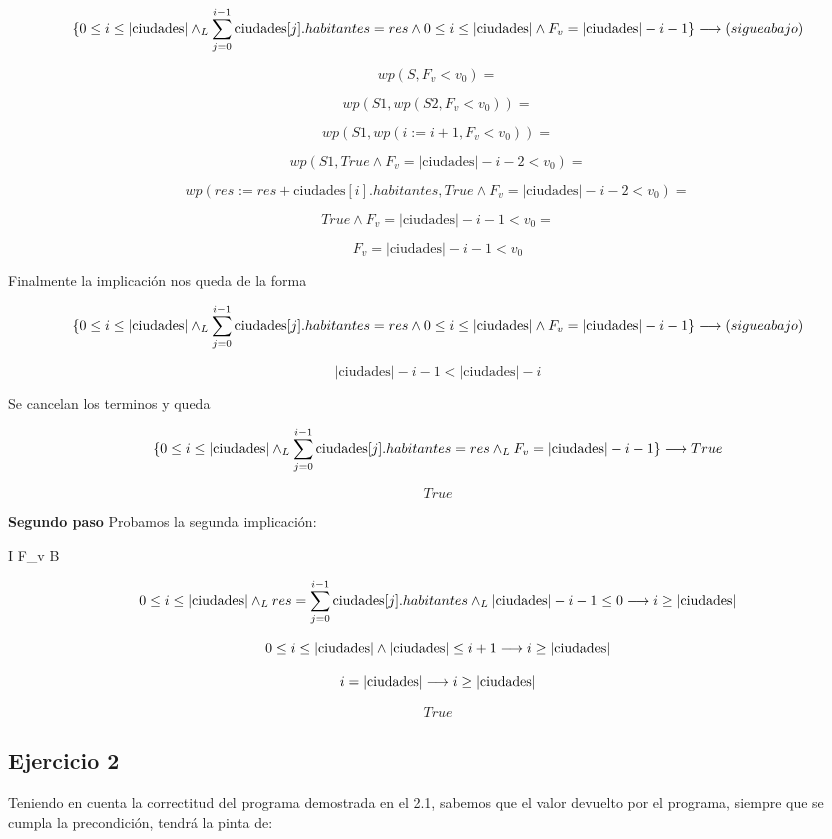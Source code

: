 \documentclass[10pt,a4paper]{article}
\begin{document}
\[
\{0 \leq i \leq |\text{ciudades}| \land _L \sum_{j=0}^{i-1} \text{ciudades}[j].habitantes = res \land 0 \leq i \leq |\text{ciudades}| \land F_v = |\text{ciudades}| - i - 1\} \longrightarrow (sigue abajo)
\]

\[
wp(S, F_v < v_0) =
\]

\[
wp(S1, wp(S2, F_v < v_0)) =
\]

\[
wp(S1, wp(i:=i+1, F_v < v_0)) =
\]

\[
wp(S1, True \land F_v = |\text{ciudades}| - i - 2 < v_0) =
\]

\[
wp(res:= res + \text{ciudades}[i].habitantes, True \land F_v = |\text{ciudades}| - i - 2 < v_0) = 
\]

\[
True \land F_v = |\text{ciudades}| - i - 1 < v_0 =
\]

\[
F_v = |\text{ciudades}| - i - 1 < v_0
\]

Finalmente la implicación nos queda de la forma

\[
\{0 \leq i \leq |\text{ciudades}| \land _L \sum_{j=0}^{i-1} \text{ciudades}[j].habitantes = res \land 0 \leq i \leq |\text{ciudades}| \land F_v = |\text{ciudades}| - i - 1\} \longrightarrow (sigue abajo)
\]

\[
|\text{ciudades}| - i - 1 < |\text{ciudades}| - i 
\]

Se cancelan los terminos y queda

\[
\{0 \leq i \leq |\text{ciudades}| \land _L \sum_{j=0}^{i-1} \text{ciudades}[j].habitantes = res \land _L F_v = |\text{ciudades}| - i - 1 \} \longrightarrow True
\]

\[
True
\]

\textbf{Segundo paso} Probamos la segunda implicación:

I \land F_v  \implica \neg B

\[
0 \leq i \leq |\text{ciudades}| \land _L res = \sum_{j=0}^{i-1} \text{ciudades}[j].habitantes \land _L |\text{ciudades}| - i - 1 \leq 0 \longrightarrow i \geq |\text{ciudades}|
\]

\[
0 \leq i \leq |\text{ciudades}| \land |\text{ciudades}| \leq i + 1 \longrightarrow i \geq |\text{ciudades}|
\]

\[
i = |\text{ciudades}| \longrightarrow i \geq |\text{ciudades}|
\]

\[
True
\]

\subsection{Ejercicio 2}

Teniendo en cuenta la correctitud del programa demostrada en el 2.1, sabemos que el valor devuelto por el programa, siempre que se cumpla la precondición, tendrá la pinta de:
\end{document}

